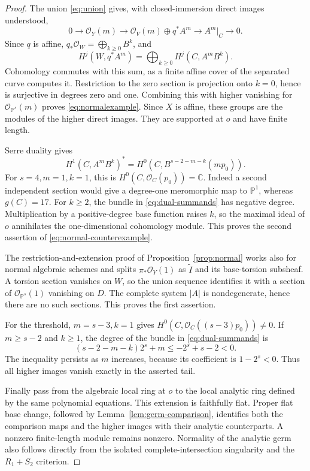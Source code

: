 \documentclass[11pt,reqno]{amsart}
\numberwithin{equation}{section}
\theoremstyle{definition}
\theoremstyle{remark}
\newcommand{\OO}{\mathcal O}
\newcommand{\PP}{\mathbb P}
\newcommand{\CC}{\mathbb C}
\begin{document}
\begin{proof}
The union \eqref{eq:union} gives, with closed-immersion direct images understood,
\[
 0\to\OO_Y(m)\to\OO_V(m)\oplus q^*A^m\to A^m|_C\to0.
\]
Since $q$ is affine, $q_*\OO_W=\bigoplus_{k\geq0}B^k$, and
\[
 H^j(W,q^*A^m)=\bigoplus_{k\geq0}H^j(C,A^mB^k).
\]
Cohomology commutes with this sum, as a finite affine cover of the separated curve computes it. Restriction to the zero section is projection onto $k=0$, hence is surjective in degrees zero and one. Combining this with higher vanishing for $\OO_{\PP^s}(m)$ proves \eqref{eq:normalexample}. Since $X$ is affine, these groups are the modules of the higher direct images. They are supported at $o$ and have finite length.

Serre duality gives
\begin{equation}\label{eq:dual-summands}
 H^1(C,A^mB^k)^*=H^0(C,B^{s-2-m-k}(mp_0)).
\end{equation}
For $s=4,m=1,k=1$, this is $H^0(C,\OO_C(p_0))=\CC$. Indeed a second independent section would give a degree-one meromorphic map to $\PP^1$, whereas $g(C)=17$. For $k\geq2$, the bundle in \eqref{eq:dual-summands} has negative degree. Multiplication by a positive-degree base function raises $k$, so the maximal ideal of $o$ annihilates the one-dimensional cohomology module. This proves the second assertion of \eqref{eq:normal-counterexample}.

The restriction-and-extension proof of Proposition~\ref{prop:normal} works also for normal algebraic schemes and splits $\pi_*\OO_Y(1)$ as $\widetilde I$ and its base-torsion subsheaf. A torsion section vanishes on $W$, so the union sequence identifies it with a section of $\OO_{\PP^s}(1)$ vanishing on $D$. The complete system $|A|$ is nondegenerate, hence there are no such sections. This proves the first assertion.

For the threshold, $m=s-3,k=1$ gives $H^0(C,\OO_C((s-3)p_0))\neq0$. If $m\geq s-2$ and $k\geq1$, the degree of the bundle in \eqref{eq:dual-summands} is
\[
 (s-2-m-k)2^s+m\leq-2^s+s-2<0.
\]
The inequality persists as $m$ increases, because its coefficient is $1-2^s<0$. Thus all higher images vanish exactly in the asserted tail.

Finally pass from the algebraic local ring at $o$ to the local analytic ring defined by the same polynomial equations. This extension is faithfully flat. Proper flat base change, followed by Lemma~\ref{lem:germ-comparison}, identifies both the comparison maps and the higher images with their analytic counterparts. A nonzero finite-length module remains nonzero. Normality of the analytic germ also follows directly from the isolated complete-intersection singularity and the $R_1+S_2$ criterion.
\end{proof}
\end{document}
